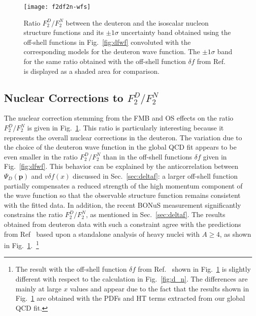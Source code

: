 \documentclass[%
      aps,
      prd,
      floatfix,
      preprintnumbers,
      preprint,
      showpacs,
      nofootinbib,
      tightenlines,
      amssymb,
      amsmath
]{revtex4-1}
\begin{document}
\begin{figure}[tb] %
\begin{center}
\texttt{[image: f2df2n-wfs]}
\caption{%
Ratio $F_2^D/F_2^N$ between the deuteron and the isoscalar nucleon structure functions and its 
$\pm 1 \sigma$ uncertainty band obtained using the off-shell functions in Fig.~\ref{fig:dfwf} 
convoluted with the corresponding models for the deuteron wave function.
The $\pm 1 \sigma$ band for the same ratio obtained with the off-shell function $\delta f$ 
from Ref.~\cite{KP04} is displayed as a shaded area for comparison. 
}
\label{fig:f2d}
\end{center}
\end{figure}



\subsection{Nuclear Corrections to $F_2^D/F_2^N$}
\label{sec:f2df2n}

The nuclear correction stemming from the FMB and OS effects on the ratio $F_2^D/F_2^N$ 
is given in Fig.~\ref{fig:f2d}. This ratio is particularly interesting because it represents  
the overall nuclear corrections in the deuteron. 
The variation due to the choice of the deuteron wave function 
in the global QCD fit appears to be even smaller in the ratio $F_2^D/F_2^N$ 
than in the off-shell functions $\delta f$ given in Fig.~\ref{fig:dfwf}. This behavior  
can be explained by the anticorrelation between $\Psi_D(\bm p)$ and $v\delta f(x)$ discussed 
in Sec.~\ref{sec:deltaf}: a larger off-shell function partially compensates a 
reduced strength of the high momentum component of the wave function so that the 
observable structure function remains consistent with the fitted data.  
In addition, the recent BONuS measurement significantly constrains the ratio $F_2^D/F_2^N$, 
as mentioned in Sec.~\ref{sec:deltaf}. 
The results obtained from deuteron data with such a constraint agree 
with the predictions from Ref~\cite{KP04} based upon a standalone analysis of 
heavy nuclei with $A\geq4$, as shown in Fig.~\ref{fig:f2d}.~\footnote{ 
The result with the off-shell function $\delta f$ from Ref.~\cite{KP04} shown 
in Fig.~\ref{fig:f2d} is slightly different with respect to the calculation in Fig.~\ref{fig:d_n}. 
The differences are mainly at large $x$ values and appear due to the fact that the results 
shown in Fig.~\ref{fig:f2d} are obtained with the PDFs and HT terms extracted from our global 
QCD fit.} 
\end{document}
